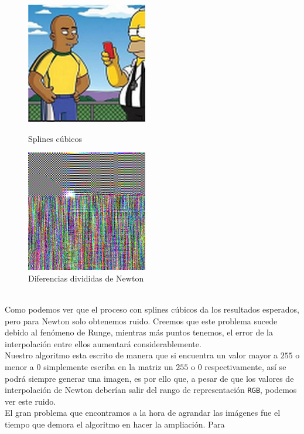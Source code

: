 \documentclass[spanish, fleqn]{article}
\begin{document}
\begin{enumerate}
			\begin{figure}[ht!]
				\begin{minipage}[b]{0.5\linewidth}
					\centering
					\includegraphics[width=200px]{Graficos/5xhomero_spline.png}
					\caption{Splines cúbicos}
				\end{minipage}
				\begin{minipage}[b]{0.5\linewidth}
					\centering
					\includegraphics[width=200px]{Graficos/5xhomero_newton.png}
					\caption{Diferencias divididas de Newton}
				\end{minipage}
			\end{figure}
			\\Como podemos ver que el proceso con splines cúbicos da los
			resultados esperados, pero para Newton solo obtenemos ruido.
			Creemos que este problema sucede debido al fenómeno de Runge,
			mientras más puntos tenemos, el error de la interpolación entre
			ellos aumentará considerablemente.\\
			Nuestro algoritmo esta escrito de manera que si encuentra un valor
			mayor a $255$ o menor a $0$ simplemente escriba en la matriz un 
			$255$ o $0$ respectivamente, así se podrá siempre generar una
			imagen, es por ello que, a pesar de que los valores de interpolación
			de Newton deberían salir del rango de representación \texttt{RGB},
			podemos ver este ruido.\\
			El gran problema que encontramos a la hora de agrandar las imágenes
			fue el tiempo que demora el algoritmo en hacer la ampliación. Para

\end{enumerate}
\end{document}
